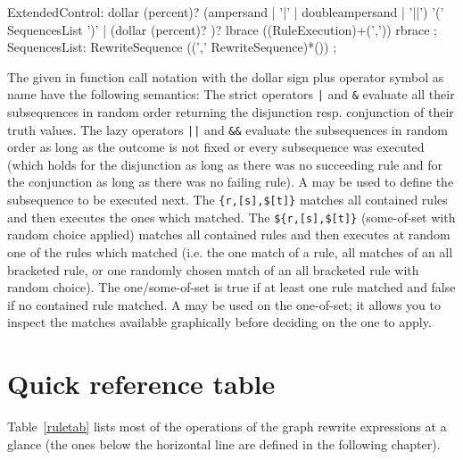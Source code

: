 \begin{rail} 
  ExtendedControl: 
	dollar (percent)? (ampersand | '|' | doubleampersand | '||') '(' SequencesList ')' |
	(dollar (percent)? )? lbrace ((RuleExecution)+(',')) rbrace
	;
  SequencesList:
	RewriteSequence ((',' RewriteSequence)*())
	;
\end{rail}

The  given in function call notation with the dollar sign plus operator symbol as name have the following semantics:
The strict operators \verb/|/ and \verb/&/ evaluate all their subsequences in random order returning the disjunction resp. conjunction of their truth values.
The lazy operators \verb/||/ and \verb/&&/ evaluate the subsequences in random order as long as the outcome is not fixed or every subsequence was executed 
(which holds for the disjunction as long as there was no succeeding rule and for the conjunction as long as there was no failing rule).
A  may be used to define the subsequence to be executed next.
The  \verb/{r,[s],$[t]}/ matches all contained rules and then executes the ones which matched.
The  \verb/${r,[s],$[t]}/ (some-of-set with random choice applied) matches all contained rules and then executes at random one of the rules which matched
(i.e. the one match of a rule, all matches of an all bracketed rule, or one randomly chosen match of an all bracketed rule with random choice).
The one/some-of-set is true if at least one rule matched and false if no contained rule matched.
A  may be used on the one-of-set; it allows you to inspect the matches available graphically before deciding on the one to apply. 


\section{Quick reference table}

Table~\ref{ruletab} lists most of the operations of the graph rewrite expressions at a glance (the ones below the horizontal line are defined in the following chapter).

